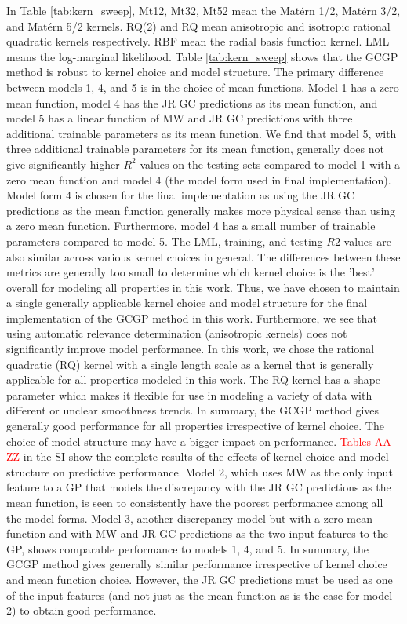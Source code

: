 \documentclass[journal=jacsat,manuscript=article]{achemso}
\begin{document}
In Table \ref{tab:kern_sweep}, Mt12, Mt32, Mt52 mean the Mat\'ern 1/2, Mat\'ern 3/2, and Mat\'ern 5/2 kernels. RQ(2) and RQ mean anisotropic and isotropic rational quadratic kernels respectively. RBF mean the radial basis function kernel. LML means the log-marginal likelihood.
Table \ref{tab:kern_sweep} shows that the GCGP method is robust to kernel choice and model structure. The primary difference between models 1, 4, and 5 is in the choice of mean functions. Model 1 has a zero mean function, model 4 has the JR GC predictions as its mean function, and model 5 has a linear function of MW and JR GC predictions with three additional trainable parameters as its mean function.
We find that model 5, with three additional trainable parameters for its mean function, generally does not give significantly higher $R^2$ values on the testing sets compared to model 1 with a zero mean function and model 4 (the model form used in final implementation). Model form 4 is chosen for the final implementation as using the JR GC predictions as the mean function generally makes more physical sense than using a zero mean function. Furthermore, model 4 has a small number of trainable parameters compared to model 5.
The LML, training, and testing $ R2$ values are also similar across various kernel choices in general. The differences between these metrics are generally too small to determine which kernel choice is the 'best' overall for modeling all properties in this work. Thus, we have chosen to maintain a single generally applicable kernel choice and model structure for the final implementation of the GCGP method in this work.
Furthermore, we see that using automatic relevance determination (anisotropic kernels) does not significantly improve model performance.
In this work, we chose the rational quadratic (RQ) kernel with a single length scale as a kernel that is generally applicable for all properties modeled in this work. The RQ kernel has a shape parameter which makes it flexible for use in modeling a variety of data with different or unclear smoothness trends. In summary, the GCGP method gives generally good performance for all properties irrespective of kernel choice. The choice of model structure may have a bigger impact on performance.  \textcolor{red}{Tables AA - ZZ} in the SI show the complete results of the effects of kernel choice and model structure on predictive performance. Model 2, which uses MW as the only input feature to a  GP that models the discrepancy with the JR GC predictions as the mean function, is seen to consistently have the poorest performance among all the model forms. Model 3, another discrepancy model but with a zero mean function and with MW and JR GC predictions as the two input features to the GP, shows comparable performance to models 1, 4, and 5. In summary, the GCGP method gives generally similar performance irrespective of kernel choice and mean function choice. However, the JR GC predictions must be used as one of the input features (and not just as the mean function as is the case for model 2) to obtain good performance.
\end{document}

